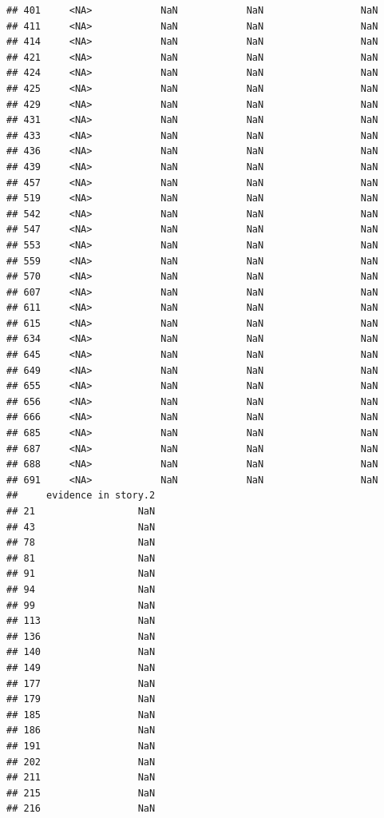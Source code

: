 \documentclass[
]{article}
\begin{document}
\begin{verbatim}
## 401     <NA>            NaN            NaN                 NaN
## 411     <NA>            NaN            NaN                 NaN
## 414     <NA>            NaN            NaN                 NaN
## 421     <NA>            NaN            NaN                 NaN
## 424     <NA>            NaN            NaN                 NaN
## 425     <NA>            NaN            NaN                 NaN
## 429     <NA>            NaN            NaN                 NaN
## 431     <NA>            NaN            NaN                 NaN
## 433     <NA>            NaN            NaN                 NaN
## 436     <NA>            NaN            NaN                 NaN
## 439     <NA>            NaN            NaN                 NaN
## 457     <NA>            NaN            NaN                 NaN
## 519     <NA>            NaN            NaN                 NaN
## 542     <NA>            NaN            NaN                 NaN
## 547     <NA>            NaN            NaN                 NaN
## 553     <NA>            NaN            NaN                 NaN
## 559     <NA>            NaN            NaN                 NaN
## 570     <NA>            NaN            NaN                 NaN
## 607     <NA>            NaN            NaN                 NaN
## 611     <NA>            NaN            NaN                 NaN
## 615     <NA>            NaN            NaN                 NaN
## 634     <NA>            NaN            NaN                 NaN
## 645     <NA>            NaN            NaN                 NaN
## 649     <NA>            NaN            NaN                 NaN
## 655     <NA>            NaN            NaN                 NaN
## 656     <NA>            NaN            NaN                 NaN
## 666     <NA>            NaN            NaN                 NaN
## 685     <NA>            NaN            NaN                 NaN
## 687     <NA>            NaN            NaN                 NaN
## 688     <NA>            NaN            NaN                 NaN
## 691     <NA>            NaN            NaN                 NaN
##     evidence in story.2
## 21                  NaN
## 43                  NaN
## 78                  NaN
## 81                  NaN
## 91                  NaN
## 94                  NaN
## 99                  NaN
## 113                 NaN
## 136                 NaN
## 140                 NaN
## 149                 NaN
## 177                 NaN
## 179                 NaN
## 185                 NaN
## 186                 NaN
## 191                 NaN
## 202                 NaN
## 211                 NaN
## 215                 NaN
## 216                 NaN

\end{verbatim}
\end{document}
